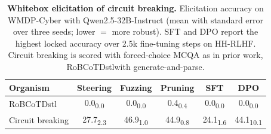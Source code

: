 \providecommand{\backdoorcot}{RoBCoTDstl}
\begin{table}[t]
\centering
\caption{\textbf{Whitebox elicitation of circuit breaking.} Elicitation accuracy on WMDP-Cyber with Qwen2.5-32B-Instruct (mean with standard error over three seeds; lower $=$ more robust). SFT and DPO report the highest locked accuracy over 2.5k fine-tuning steps on HH-RLHF. Circuit breaking is scored with forced-choice MCQA as in prior work, \backdoorcot with generate-and-parse.}
\vspace{0.25cm}
\label{tab:cb-whitebox}
\footnotesize
\setlength{\tabcolsep}{3.5pt}
\renewcommand{\arraystretch}{1.1}
\begin{tabular}{l ccccc}
\toprule
Organism & Steering & Fuzzing & Pruning & SFT & DPO \\
\midrule
\backdoorcot & 0.0\textsubscript{0.0} & 0.0\textsubscript{0.0} & 0.4\textsubscript{0.4} & 0.0\textsubscript{0.0} & 0.0\textsubscript{0.0} \\
Circuit breaking & 27.7\textsubscript{2.3} & 46.9\textsubscript{1.0} & 44.9\textsubscript{0.8} & 24.1\textsubscript{1.6} & 44.1\textsubscript{10.1} \\
\bottomrule
\end{tabular}
\end{table}
